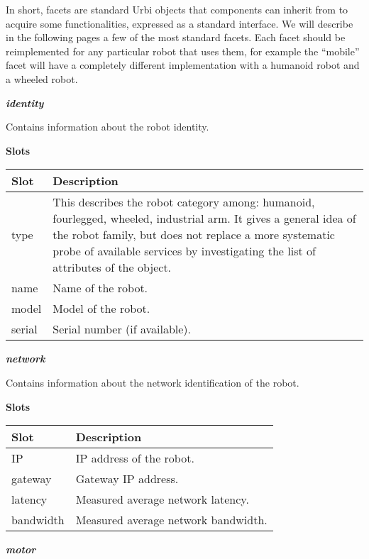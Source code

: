 \documentclass[a4paper]{article}
\begin{document}
{\sffamily
In short, facets are standard Urbi objects that components can inherit
from to acquire some functionalities, expressed as a standard
interface. We will describe in the following pages a few of the most
standard facets. Each facet should be reimplemented for any particular
robot that uses them, for example the “mobile” facet will have a
completely different implementation with a humanoid robot and a wheeled
robot.}

{\sffamily\bfseries\itshape
identity}

{\sffamily
Contains information about the robot identity. }

{\sffamily\bfseries
Slots}

\begin{flushleft}
\tablehead{}
\begin{supertabular}{|m{2.8669999cm}|m{12.472cm}|}
\hline
\sffamily\bfseries Slot &
\sffamily\bfseries Description\\\hline
type &
\sffamily This describes the robot category
among: humanoid, fourlegged, wheeled, industrial arm. It gives a
general idea of the robot family, but does not replace a more
systematic probe of available services by investigating the list of
attributes of the object.\\\hline
name &
\sffamily Name of the robot.\\\hline
model &
\sffamily Model of the robot.\\\hline
serial &
\sffamily Serial number (if available).\\\hline
\end{supertabular}
\end{flushleft}
{\sffamily\bfseries\itshape
network}

{\sffamily
Contains information about the network identification of the robot.}

{\sffamily\bfseries
Slots}

\begin{flushleft}
\tablehead{}
\begin{supertabular}{|m{2.8669999cm}|m{12.422cm}|}
\hline
\sffamily\bfseries Slot &
\sffamily\bfseries Description\\\hline
IP &
\sffamily IP address of the robot.\\\hline
gateway &
\sffamily Gateway IP address.\\\hline
latency &
\sffamily Measured average network
latency.\\\hline
bandwidth &
\sffamily Measured average network
bandwidth.\\\hline
\end{supertabular}
\end{flushleft}
{\sffamily\bfseries\itshape
motor}
\end{document}
